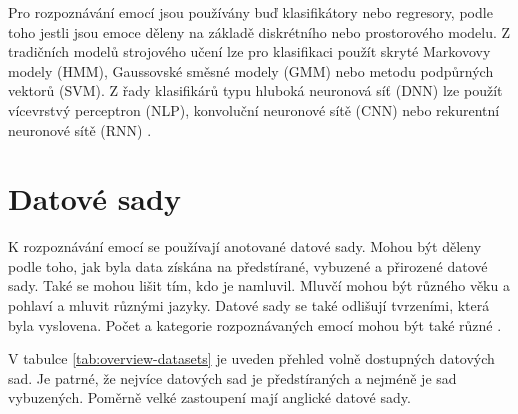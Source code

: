 \documentclass[FM,BP]{tulthesis}
\begin{document}
Pro rozpoznávání emocí jsou používány buď klasifikátory nebo regresory, podle toho jestli jsou emoce děleny na základě diskrétního nebo prostorového modelu. Z tradičních modelů strojového učení lze pro klasifikaci použít skryté Markovovy modely (HMM), Gaussovské směsné modely (GMM) nebo metodu podpůrných vektorů (SVM). Z řady klasifikárů typu hluboká neuronová síť (DNN) lze použít vícevrstvý perceptron (NLP), konvoluční neuronové sítě (CNN) nebo rekurentní neuronové sítě (RNN) \cite{DBLP:journals/speech/AkcayO20}.

\section{Datové sady} %
K rozpoznávání emocí se používají anotované datové sady. Mohou být děleny podle toho, jak byla data získána na předstírané, vybuzené a přirozené datové sady. Také se mohou lišit tím, kdo je namluvil. Mluvčí mohou být různého věku a pohlaví a mluvit různými jazyky. Datové sady se také odlišují tvrzeními, která byla vyslovena. Počet a kategorie rozpoznávaných emocí mohou být také různé \cite{DBLP:journals/speech/AkcayO20}.

V tabulce \ref{tab:overview-datasets} je uveden přehled volně dostupných datových sad. Je patrné, že nejvíce datových sad je předstíraných a nejméně je sad vybuzených. Poměrně velké zastoupení mají anglické datové sady.
\end{document}
